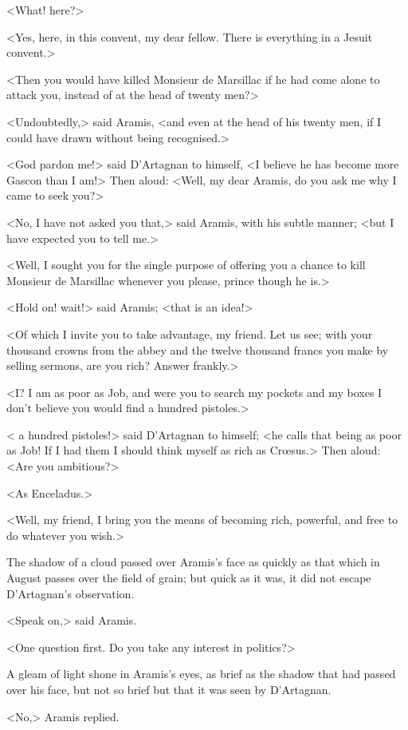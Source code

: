 <What! here?>

<Yes, here, in this convent, my dear fellow. There is everything in a Jesuit convent.>

<Then you would have killed Monsieur de Marsillac if he had come alone to attack you, instead of at the head of twenty men?>

<Undoubtedly,> said Aramis, <and even at the head of his twenty men, if I could have drawn without being recognised.>

<God pardon me!> said D'Artagnan to himself, <I believe he has become more Gascon than I am!> Then aloud: <Well, my dear Aramis, do you ask me why I came to seek you?>

<No, I have not asked you that,> said Aramis, with his subtle manner; <but I have expected you to tell me.>

<Well, I sought you for the single purpose of offering you a chance to kill Monsieur de Marsillac whenever you please, prince though he is.>

<Hold on! wait!> said Aramis; <that is an idea!>

<Of which I invite you to take advantage, my friend. Let us see; with your thousand crowns from the abbey and the twelve thousand francs you make by selling sermons, are you rich? Answer frankly.>

<I\@? I am as poor as Job, and were you to search my pockets and my boxes I don't believe you would find a hundred pistoles.>

< a hundred pistoles!> said D'Artagnan to himself; <he calls that being as poor as Job! If I had them I should think myself as rich as Crœsus.> Then aloud: <Are you ambitious?>

<As Enceladus.>

<Well, my friend, I bring you the means of becoming rich, powerful, and free to do whatever you wish.>

The shadow of a cloud passed over Aramis's face as quickly as that which in August passes over the field of grain; but quick as it was, it did not escape D'Artagnan's observation.

<Speak on,> said Aramis.

<One question first. Do you take any interest in politics?>

A gleam of light shone in Aramis's eyes, as brief as the shadow that had passed over his face, but not so brief but that it was seen by D'Artagnan.

<No,> Aramis replied.

